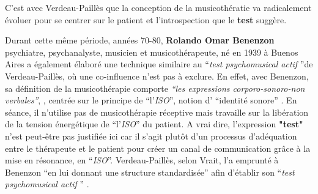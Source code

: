 C'est avec Verdeau-Paillès que la conception de la musicothératie va radicalement évoluer pour se centrer sur le patient et l'introspection que le \textbf{test} suggère.

 Durant cette même période, années 70-80,
\textbf{ Rolando Omar Benenzon} psychiatre, psychanalyste,
musicien et musicothérapeute, né en 1939 à Buenos Aires a également élaboré une technique similaire au \enquote {\textit{test psychomusical actif} }de Verdeau-Paillès,
 où une co-influence n'est pas à exclure.
 En effet, avec Benenzon, sa définition de la musicothérapie comporte
\emph{\textsl{ ``les expressions corporo-sonoro-non
     verbales''}}, \autocite{benenzon:musicotherapie},
centrée sur le principe de \enquote{l'\textit{ISO}}, notion
 d' \enquote{identité sonore} \autocite{benenzon:musicotherapie}.
En séance, il n'utilise pas de
 musicothérapie réceptive mais travaille sur la libération de
 la tension énergétique de \enquote{l'\textit{ISO}} du patient.
A vrai dire, l'expression \textbf{"test"} n'est peut-être pas justifiée ici car il s'agit plutôt d'un processus d'adéquation entre le thérapeute et le patient pour créer un canal de communication grâce à la mise en résonance, en \enquote{\textit{ISO}}. Verdeau-Paillès, selon Vrait, l'a emprunté à Benenzon  \enquote {en lui donnant une structure standardisée} afin d'établir son \enquote {\textit{test psychomusical actif} } \autocite[p. 39]{vrait_musicotherapie_2018}.











